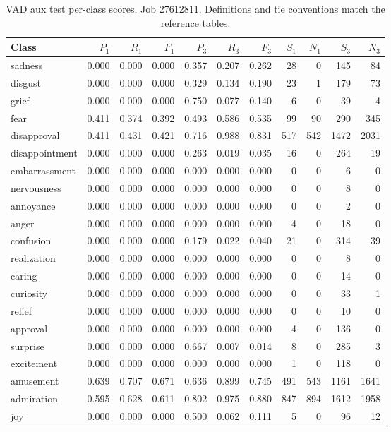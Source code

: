 \begin{table}[!htbp]
\centering
\scriptsize
\setlength{\tabcolsep}{5pt}
\begin{tabular}{lrrrrrrrrrr}
\toprule
Class & $P_1$ & $R_1$ & $F_1$ & $P_3$ & $R_3$ & $F_3$ & $S_1$ & $N_1$ & $S_3$ & $N_3$ \\
\midrule
sadness & 0.000 & 0.000 & 0.000 & 0.357 & 0.207 & 0.262 & 28 & 0 & 145 & 84 \\
disgust & 0.000 & 0.000 & 0.000 & 0.329 & 0.134 & 0.190 & 23 & 1 & 179 & 73 \\
grief & 0.000 & 0.000 & 0.000 & 0.750 & 0.077 & 0.140 & 6 & 0 & 39 & 4 \\
fear & 0.411 & 0.374 & 0.392 & 0.493 & 0.586 & 0.535 & 99 & 90 & 290 & 345 \\
disapproval & 0.411 & 0.431 & 0.421 & 0.716 & 0.988 & 0.831 & 517 & 542 & 1472 & 2031 \\
disappointment & 0.000 & 0.000 & 0.000 & 0.263 & 0.019 & 0.035 & 16 & 0 & 264 & 19 \\
embarrassment & 0.000 & 0.000 & 0.000 & 0.000 & 0.000 & 0.000 & 0 & 0 & 6 & 0 \\
nervousness & 0.000 & 0.000 & 0.000 & 0.000 & 0.000 & 0.000 & 0 & 0 & 8 & 0 \\
annoyance & 0.000 & 0.000 & 0.000 & 0.000 & 0.000 & 0.000 & 0 & 0 & 2 & 0 \\
anger & 0.000 & 0.000 & 0.000 & 0.000 & 0.000 & 0.000 & 4 & 0 & 18 & 0 \\
confusion & 0.000 & 0.000 & 0.000 & 0.179 & 0.022 & 0.040 & 21 & 0 & 314 & 39 \\
realization & 0.000 & 0.000 & 0.000 & 0.000 & 0.000 & 0.000 & 0 & 0 & 8 & 0 \\
caring & 0.000 & 0.000 & 0.000 & 0.000 & 0.000 & 0.000 & 0 & 0 & 14 & 0 \\
curiosity & 0.000 & 0.000 & 0.000 & 0.000 & 0.000 & 0.000 & 0 & 0 & 33 & 1 \\
relief & 0.000 & 0.000 & 0.000 & 0.000 & 0.000 & 0.000 & 0 & 0 & 10 & 0 \\
approval & 0.000 & 0.000 & 0.000 & 0.000 & 0.000 & 0.000 & 4 & 0 & 136 & 0 \\
surprise & 0.000 & 0.000 & 0.000 & 0.667 & 0.007 & 0.014 & 8 & 0 & 285 & 3 \\
excitement & 0.000 & 0.000 & 0.000 & 0.000 & 0.000 & 0.000 & 1 & 0 & 118 & 0 \\
amusement & 0.639 & 0.707 & 0.671 & 0.636 & 0.899 & 0.745 & 491 & 543 & 1161 & 1641 \\
admiration & 0.595 & 0.628 & 0.611 & 0.802 & 0.975 & 0.880 & 847 & 894 & 1612 & 1958 \\
joy & 0.000 & 0.000 & 0.000 & 0.500 & 0.062 & 0.111 & 5 & 0 & 96 & 12 \\
\bottomrule
\end{tabular}
\caption{VAD aux test per-class scores. Job 27612811. Definitions and tie conventions match the reference tables.}
\label{tab:classes-b_vad_aux}
\end{table}
